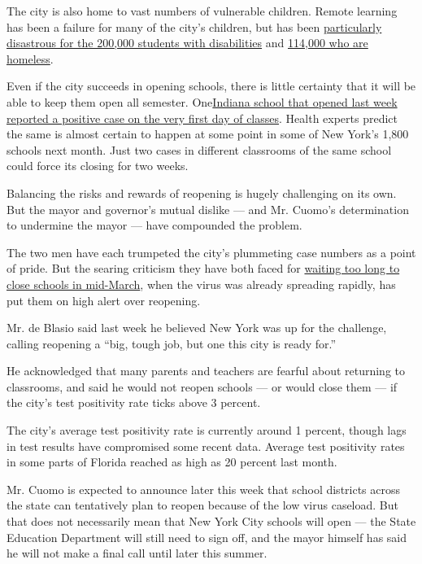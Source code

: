 The city is also home to vast numbers of vulnerable children. Remote
learning has been a failure for many of the city's children, but has
been
\href{https://www.nytimes3xbfgragh.onion/2020/04/16/nyregion/special-education-coronavirus-nyc.html}{particularly
disastrous for the 200,000 students with disabilities} and
\href{https://www.nytimes3xbfgragh.onion/interactive/2019/11/19/nyregion/student-homelessness-nyc.html}{114,000
who are homeless}.

Even if the city succeeds in opening schools, there is little certainty
that it will be able to keep them open all semester.
One\href{https://www.nytimes3xbfgragh.onion/2020/08/01/us/schools-reopening-indiana-coronavirus.html}{Indiana
school that opened last week reported a positive case on the very first
day of classes}. Health experts predict the same is almost certain to
happen at some point in some of New York's 1,800 schools next month.
Just two cases in different classrooms of the same school could force
its closing for two weeks.

Balancing the risks and rewards of reopening is hugely challenging on
its own. But the mayor and governor's mutual dislike --- and Mr. Cuomo's
determination to undermine the mayor --- have compounded the problem.

The two men have each trumpeted the city's plummeting case numbers as a
point of pride. But the searing criticism they have both faced for
\href{https://www.nytimes3xbfgragh.onion/2020/03/15/nyregion/nyc-schools-closed.html}{waiting
too long to close schools in mid-March}, when the virus was already
spreading rapidly, has put them on high alert over reopening.

Mr. de Blasio said last week he believed New York was up for the
challenge, calling reopening a ``big, tough job, but one this city is
ready for.''

He acknowledged that many parents and teachers are fearful about
returning to classrooms, and said he would not reopen schools --- or
would close them --- if the city's test positivity rate ticks above 3
percent.

The city's average test positivity rate is currently around 1 percent,
though lags in test results have compromised some recent data. Average
test positivity rates in some parts of Florida reached as high as 20
percent last month.

Mr. Cuomo is expected to announce later this week that school districts
across the state can tentatively plan to reopen because of the low virus
caseload. But that does not necessarily mean that New York City schools
will open --- the State Education Department will still need to sign
off, and the mayor himself has said he will not make a final call until
later this summer.

